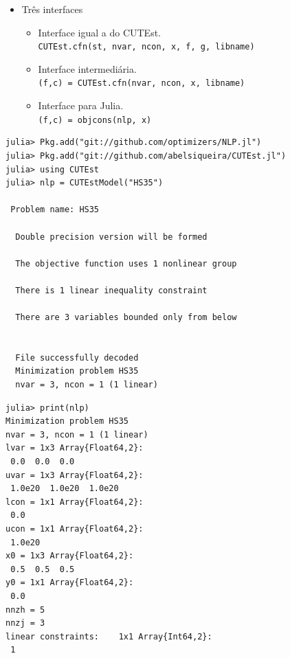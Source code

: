 \begin{frame}[fragile]
  \begin{itemize}
    \item Três interfaces
    \begin{itemize}
      \item Interface igual a do CUTEst. \\
        \verb+CUTEst.cfn(st, nvar, ncon, x, f, g, libname)+
      \item Interface intermediária. \\
        \verb+(f,c) = CUTEst.cfn(nvar, ncon, x, libname)+
      \item Interface para Julia. \\
        \verb+(f,c) = objcons(nlp, x)+
    \end{itemize}
  \end{itemize}
\end{frame}

\begin{frame}[fragile]
\begin{lstlisting}
julia> Pkg.add("git://github.com/optimizers/NLP.jl")
julia> Pkg.add("git://github.com/abelsiqueira/CUTEst.jl")
julia> using CUTEst
julia> nlp = CUTEstModel("HS35")

 Problem name: HS35

  Double precision version will be formed

  The objective function uses 1 nonlinear group

  There is 1 linear inequality constraint

  There are 3 variables bounded only from below


  File successfully decoded
  Minimization problem HS35
  nvar = 3, ncon = 1 (1 linear)
\end{lstlisting}
\end{frame}

\begin{frame}[fragile]
\begin{lstlisting}
julia> print(nlp)
Minimization problem HS35
nvar = 3, ncon = 1 (1 linear)
lvar = 1x3 Array{Float64,2}:
 0.0  0.0  0.0
uvar = 1x3 Array{Float64,2}:
 1.0e20  1.0e20  1.0e20
lcon = 1x1 Array{Float64,2}:
 0.0
ucon = 1x1 Array{Float64,2}:
 1.0e20
x0 = 1x3 Array{Float64,2}:
 0.5  0.5  0.5
y0 = 1x1 Array{Float64,2}:
 0.0
nnzh = 5
nnzj = 3
linear constraints:    1x1 Array{Int64,2}:
 1
\end{lstlisting}
\end{frame}

